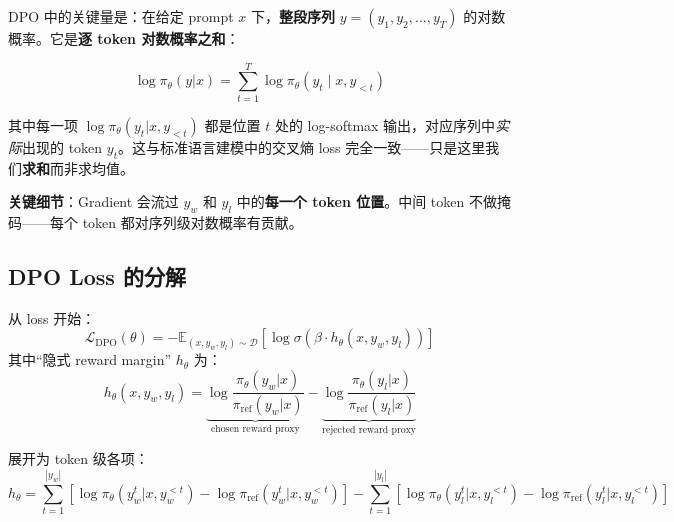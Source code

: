 DPO 中的关键量是：在给定 prompt $x$ 下，\textbf{整段序列} $y = (y_1, y_2, \ldots, y_T)$ 的对数概率。它是\textbf{逐 token 对数概率之和}：

\begin{equation}
\boxed{\log \pi_\theta(y|x) = \sum_{t=1}^{T} \log \pi_\theta(y_t \mid x, y_{<t})}
\end{equation}

其中每一项 $\log \pi_\theta(y_t | x, y_{<t})$ 都是位置 $t$ 处的 log-softmax 输出，对应序列中\emph{实际}出现的 token $y_t$。这与标准语言建模中的交叉熵 loss 完全一致——只是这里我们\textbf{求和}而非求均值。

\textbf{关键细节}：Gradient 会流过 $y_w$ 和 $y_l$ 中的\textbf{每一个 token 位置}。中间 token 不做掩码——每个 token 都对序列级对数概率有贡献。

\subsection{DPO Loss 的分解}
\label{the-dpo-loss-decomposed}

从 loss 开始：
\begin{equation}
\mathcal{L}_{\text{DPO}}(\theta) = -\mathbb{E}_{(x, y_w, y_l) \sim \mathcal{D}}\!\left[\log \sigma\!\left(\beta \cdot h_\theta(x, y_w, y_l)\right)\right]
\end{equation}
其中“隐式 reward margin” $h_\theta$ 为：
\begin{equation}
h_\theta(x, y_w, y_l) = \underbrace{\log \frac{\pi_\theta(y_w|x)}{\pi_{\text{ref}}(y_w|x)}}_{\text{chosen reward proxy}} - \underbrace{\log \frac{\pi_\theta(y_l|x)}{\pi_{\text{ref}}(y_l|x)}}_{\text{rejected reward proxy}}
\end{equation}

展开为 token 级各项：
\begin{equation}
\boxed{h_\theta = \sum_{t=1}^{|y_w|}\!\left[\log\pi_\theta(y_w^t | x, y_w^{<t}) - \log\pi_{\text{ref}}(y_w^t | x, y_w^{<t})\right] - \sum_{t=1}^{|y_l|}\!\left[\log\pi_\theta(y_l^t | x, y_l^{<t}) - \log\pi_{\text{ref}}(y_l^t | x, y_l^{<t})\right]}
\end{equation}

